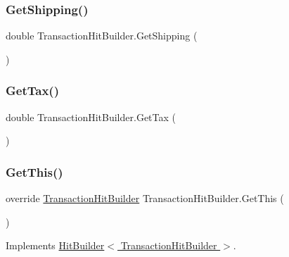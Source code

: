 \mbox{\label{class_transaction_hit_builder_a003c7c159802d9075e7adec0e5c7aa59}} 
\subsubsection{\texorpdfstring{Get\+Shipping()}{GetShipping()}}
{\footnotesize\ttfamily double Transaction\+Hit\+Builder.\+Get\+Shipping (\begin{DoxyParamCaption}{ }\end{DoxyParamCaption})}

\mbox{\label{class_transaction_hit_builder_a6b1d6a19929952515ac3800b6a13a811}} 
\subsubsection{\texorpdfstring{Get\+Tax()}{GetTax()}}
{\footnotesize\ttfamily double Transaction\+Hit\+Builder.\+Get\+Tax (\begin{DoxyParamCaption}{ }\end{DoxyParamCaption})}

\mbox{\label{class_transaction_hit_builder_a6d3d242ed5f10c7801a8e2ce8aac8ba9}} 
\subsubsection{\texorpdfstring{Get\+This()}{GetThis()}}
{\footnotesize\ttfamily override \hyperlink{class_transaction_hit_builder}{Transaction\+Hit\+Builder} Transaction\+Hit\+Builder.\+Get\+This (\begin{DoxyParamCaption}{ }\end{DoxyParamCaption})\hspace{0.3cm}{\ttfamily [virtual]}}



Implements \hyperlink{class_hit_builder_a4276c57427406e264dc33f8c900ad530}{Hit\+Builder$<$ Transaction\+Hit\+Builder $>$}.

